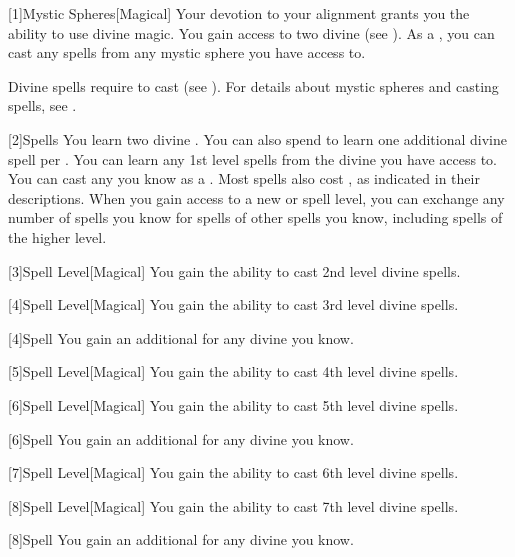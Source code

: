         [1]{Mystic Spheres}[Magical]
        Your devotion to your alignment grants you the ability to use divine magic.
        You gain access to two divine  (see ).
        As a , you can cast any  spells from any mystic sphere you have access to.

        Divine spells require  to cast (see ).
        For details about mystic spheres and casting spells, see .

        [2]{Spells} You learn two divine .
        You can also spend  to learn one additional divine spell per .
        You can learn any 1st level spells from the divine  you have access to.
        You can cast any  you know as a .
        Most spells also cost , as indicated in their descriptions.
        When you gain access to a new  or spell level, you can exchange any number of spells you know for spells of other spells you know, including spells of the higher level.

        [3]{Spell Level}[Magical] You gain the ability to cast 2nd level divine spells.

        [4]{Spell Level}[Magical] You gain the ability to cast 3rd level divine spells.

        [4]{Spell} You gain an additional  for any divine  you know.

        [5]{Spell Level}[Magical] You gain the ability to cast 4th level divine spells.

        [6]{Spell Level}[Magical] You gain the ability to cast 5th level divine spells.

        [6]{Spell} You gain an additional  for any divine  you know.

        [7]{Spell Level}[Magical] You gain the ability to cast 6th level divine spells.

        [8]{Spell Level}[Magical] You gain the ability to cast 7th level divine spells.

        [8]{Spell} You gain an additional  for any divine  you know.

